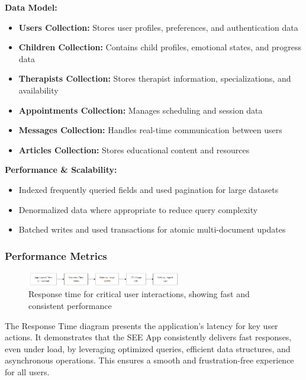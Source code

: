 ﻿\documentclass[12pt,a4paper]{article}
\newcommand{\subsectiontitle}[1]{\subsubsection{#1}}
\begin{document}
\begin{minipage}{\linewidth}
\textbf{Data Model:}
\begin{itemize}
    \item \textbf{Users Collection:} Stores user profiles, preferences, and authentication data
    \item \textbf{Children Collection:} Contains child profiles, emotional states, and progress data
    \item \textbf{Therapists Collection:} Stores therapist information, specializations, and availability
    \item \textbf{Appointments Collection:} Manages scheduling and session data
    \item \textbf{Messages Collection:} Handles real-time communication between users
    \item \textbf{Articles Collection:} Stores educational content and resources
\end{itemize}
\end{minipage}

\vspace{1em}

\begin{minipage}{\linewidth}
\textbf{Performance \& Scalability:}
\begin{itemize}
    \item Indexed frequently queried fields and used pagination for large datasets
    \item Denormalized data where appropriate to reduce query complexity
    \item Batched writes and used transactions for atomic multi-document updates
\end{itemize}
\end{minipage}

\subsectiontitle{Performance Metrics}

\begin{figure}[H]
    \centering
    \includegraphics[width=0.6\textwidth,height=0.19\textwidth,keepaspectratio]{redrawn_diagrams/Figure9_Response_Time.png}
    \caption{Response time for critical user interactions, showing fast and consistent performance}
    \label{fig:performance-metrics}
\end{figure}
\vspace{0.5em}
The Response Time diagram presents the application's latency for key user actions. It demonstrates that the SEE App consistently delivers fast responses, even under load, by leveraging optimized queries, efficient data structures, and asynchronous operations. This ensures a smooth and frustration-free experience for all users.
\end{document}
